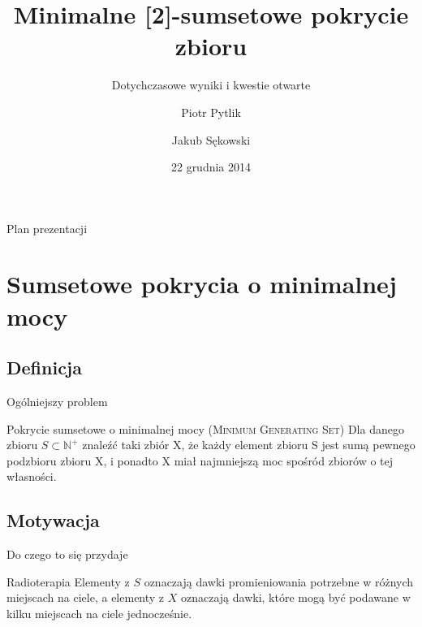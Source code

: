\documentclass{beamer}
\newcommand{\N}{\mathbb{N}}
\begin{document}
\title{Minimalne [2]-sumsetowe pokrycie zbioru}
\subtitle{Dotychczasowe wyniki i kwestie otwarte}
\author[Piotr Pytlik \& Jakub Sękowski]{Piotr Pytlik \and Jakub Sękowski}
\date{22 grudnia 2014}

\begin{frame}
	\titlepage
\end{frame}

\begin{frame}{Plan prezentacji}
	\setcounter{tocdepth}{1}
	\tableofcontents
\end{frame}

\section{Sumsetowe pokrycia o minimalnej mocy}
	\subsection{Definicja}
		\begin{frame}{Ogólniejszy problem}
			\begin{alertblock}{Pokrycie sumsetowe o minimalnej mocy (\rmfamily \textsc{Minimum Generating Set})}
                Dla danego zbioru $ S \subset \N^{+} $ znaleźć taki zbiór X, że każdy element zbioru S jest sumą pewnego podzbioru zbioru X, i ponadto X miał najmniejszą moc spośród zbiorów o tej własności.
			\end{alertblock}
		\end{frame}
		
	\subsection{Motywacja}
		\begin{frame}{Do czego to się przydaje}
            \begin{block}{Radioterapia}
    				Elementy z $ S $ oznaczają dawki promieniowania potrzebne w różnych miejscach na ciele, a elementy z $ X $ oznaczają dawki, które mogą być podawane w kilku miejscach na ciele jednocześnie.
            \end{block}
		\end{frame}	
			
\end{document}
